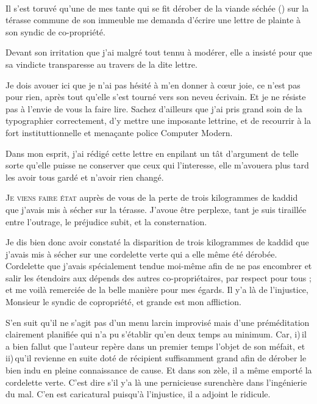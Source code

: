\pagebreak
\thispagestyle{empty}
\AddToShipoutPictureFG*{%
  \AtPageLowerLeft{}
}
~
\vfill
\pagebreak

\begin{prose}
Il s’est toruvé qu’une de mes tante qui se
fit dérober de la viande séchée () sur la térasse commune de son immeuble
me demanda d’écrire une lettre de plainte à son syndic de co-propriété.

Devant son irritation que j’ai malgré tout tennu  à modérer, elle a insisté pour que sa vindicte transparesse au travers de la dite lettre.

Je dois avouer ici que je n’ai pas hésité à m’en donner à cœur joie, ce n’est pas pour rien, après tout qu’elle s’est tourné vers son neveu écrivain. Et je ne résiste pas à l’envie de vous la faire lire. Sachez d’ailleurs que j’ai pris grand soin de la typographier correctement, d’y mettre une imposante lettrine, et de recourrir à la fort instituttionnelle et menaçante police Computer Modern.

Dans mon esprit, j’ai rédigé cette lettre en enpilant un tât d’argument de telle sorte qu’elle puisse ne conserver que ceux qui l’interesse, elle m’avouera plus tard les avoir tous gardé et n’avoir rien changé.
\end{prose}

\lettrine[lines=3]{J}{e viens faire état} auprès de vous de la perte de trois kilogrammes de kaddid que j’avais mis à sécher sur la térasse.
%
J’avoue être perplexe, tant je suis tiraillée entre l’outrage, le préjudice subit, et la consternation.

Je dis bien donc avoir constaté la disparition de trois kilogrammes de kaddid que j’avais mis à sécher sur une cordelette verte qui a elle même été dérobée. Cordelette que j’avais
spécialement tendue moi-même afin de ne pas encombrer et salir les étendoirs aux dépends des autres co-propriétaires, par respect pour tous ; et me voilà remerciée de la belle manière pour
mes égards. Il y’a là de l’injustice, Monsieur le syndic de copropriété, et grande est mon affliction.

S’en suit qu’il ne s’agit pas d’un menu larcin improvisé mais d’une préméditation clairement planifiée qui n’a pu s’établir qu’en deux temps au minimum. Car, i)\,il a bien fallut que l’auteur
repère dans un premier temps l’objet de son méfait, et ii)\,qu’il revienne en suite doté de récipient suffisamment grand afin de dérober le bien indu en pleine connaissance de cause. Et dans
son zèle, il a même emporté la cordelette verte. C’est dire s’il y’a là une pernicieuse surenchère dans l’ingénierie du mal. C’en est caricatural puisqu’à l’injustice, il a adjoint le
ridicule.

